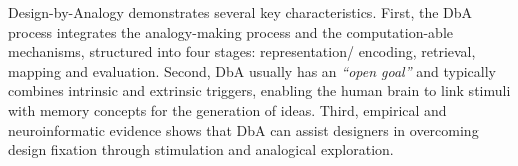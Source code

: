 Design-by-Analogy demonstrates several key characteristics. First, the DbA process integrates the analogy-making process\cite{french2002computational} and the computation-able mechanisms\cite{gentner2011computational}, structured into four stages: representation/ encoding, retrieval, mapping and evaluation\cite{jiang2022data, fu2014bio, fu2015design}. Second, DbA usually has an \textit{``open goal''}\cite{tseng2008role} and typically combines intrinsic and extrinsic triggers\cite{moreno2015step, moreno2016overcoming}, enabling the human brain to link stimuli with memory concepts for the generation of ideas\cite{goucher2019neuroimaging}. Third, empirical and neuroinformatic evidence shows \cite{moreno2015step, goucher2019neuroimaging} that DbA can assist designers in overcoming design fixation through stimulation and analogical exploration.


